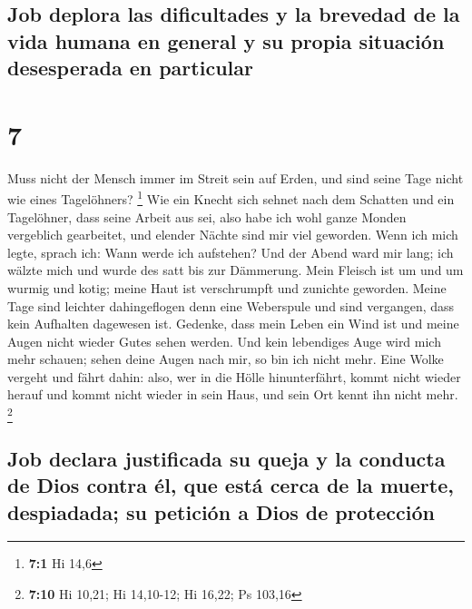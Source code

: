 \hypertarget{job-deplora-las-dificultades-y-la-brevedad-de-la-vida-humana-en-general-y-su-propia-situaciuxf3n-desesperada-en-particular}{%
\subsection{Job deplora las dificultades y la brevedad de la vida humana
en general y su propia situación desesperada en
particular}\label{job-deplora-las-dificultades-y-la-brevedad-de-la-vida-humana-en-general-y-su-propia-situaciuxf3n-desesperada-en-particular}}

\hypertarget{section-6}{%
\section{7}\label{section-6}}

 Muss nicht der Mensch immer im Streit sein auf Erden, und
sind seine Tage nicht wie eines Tagelöhners? \footnote{\textbf{7:1} Hi
  14,6}  Wie ein Knecht sich sehnet nach dem Schatten und
ein Tagelöhner, dass seine Arbeit aus sei,  also habe ich
wohl ganze Monden vergeblich gearbeitet, und elender Nächte sind mir
viel geworden.  Wenn ich mich legte, sprach ich: Wann
werde ich aufstehen? Und der Abend ward mir lang; ich wälzte mich und
wurde des satt bis zur Dämmerung.  Mein Fleisch ist um und
um wurmig und kotig; meine Haut ist verschrumpft und zunichte geworden.
 Meine Tage sind leichter dahingeflogen denn eine
Weberspule und sind vergangen, dass kein Aufhalten dagewesen ist.
 Gedenke, dass mein Leben ein Wind ist und meine Augen
nicht wieder Gutes sehen werden.  Und kein lebendiges Auge
wird mich mehr schauen; sehen deine Augen nach mir, so bin ich nicht
mehr.  Eine Wolke vergeht und fährt dahin: also, wer in
die Hölle hinunterfährt, kommt nicht wieder herauf  und
kommt nicht wieder in sein Haus, und sein Ort kennt ihn nicht mehr.
\footnote{\textbf{7:10} Hi 10,21; Hi 14,10-12; Hi 16,22; Ps 103,16}

\hypertarget{job-declara-justificada-su-queja-y-la-conducta-de-dios-contra-uxe9l-que-estuxe1-cerca-de-la-muerte-despiadada-su-peticiuxf3n-a-dios-de-protecciuxf3n}{%
\subsection{Job declara justificada su queja y la conducta de Dios
contra él, que está cerca de la muerte, despiadada; su petición a Dios
de
protección}\label{job-declara-justificada-su-queja-y-la-conducta-de-dios-contra-uxe9l-que-estuxe1-cerca-de-la-muerte-despiadada-su-peticiuxf3n-a-dios-de-protecciuxf3n}}

